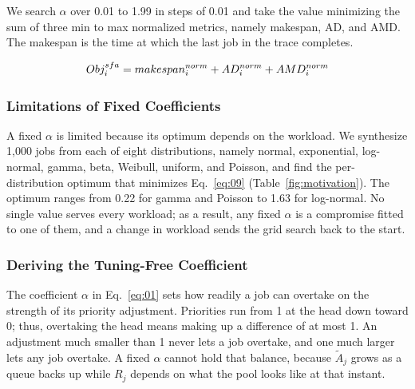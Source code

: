 \documentclass{ieeetj}
\begin{document}
We search $\alpha$ over 0.01 to 1.99 in steps of 0.01 and take the value minimizing the sum of three min to max normalized metrics, namely makespan, AD, and AMD. The makespan is the time at which the last job in the trace completes. 

\begin{equation}
Obj_i^{sfa} = makespan_i^{norm} + AD_i^{norm} + AMD_i^{norm}
\label{eq:09}
\vspace{2pt}
\end{equation}

\subsubsection{Limitations of Fixed Coefficients}\label{coeff:limit}
A fixed $\alpha$ is limited because its optimum depends on the workload. We synthesize 1,000 jobs from each of eight distributions, namely normal, exponential, log-normal, gamma, beta, Weibull, uniform, and Poisson, and find the per-distribution optimum that minimizes Eq.~\eqref{eq:09} (Table~\ref{fig:motivation}). The optimum ranges from 0.22 for gamma and Poisson to 1.63 for log-normal. No single value serves every workload; as a result, any fixed $\alpha$ is a compromise fitted to one of them, and a change in workload sends the grid search back to the start.

\begin{table}[htb!]
\centering
\caption{Optimal $\alpha$ by distribution}
\label{fig:motivation}
\footnotesize
\setlength{\tabcolsep}{4pt}
\end{table}

\subsubsection{Deriving the Tuning-Free Coefficient} \label{alphaeff}
The coefficient $\alpha$ in Eq.~\eqref{eq:01} sets how readily a job can overtake on the strength of its priority adjustment. Priorities run from 1 at the head down toward 0; thus, overtaking the head means making up a difference of at most 1. An adjustment much smaller than 1 never lets a job overtake, and one much larger lets any job overtake. A fixed $\alpha$ cannot hold that balance, because $\tilde A_j$ grows as a queue backs up while $R_j$ depends on what the pool looks like at that instant.
\end{document}
